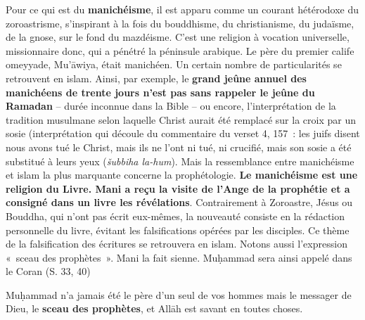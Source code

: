 

Pour ce qui est du \textbf{manichéisme}, il est apparu comme un courant
hétérodoxe du zoroastrisme, s'inspirant à la fois du bouddhisme, du
christianisme, du judaïsme, de la gnose, sur le fond du mazdéisme. C'est
une religion à vocation universelle, missionnaire donc, qui a pénétré la
péninsule arabique. Le père du premier calife omeyyade, Mu'āwiya, était
manichéen. Un certain nombre de particularités se retrouvent en islam.
Ainsi, par exemple, le \textbf{grand jeûne annuel des manichéens de
trente jours n'est pas sans rappeler le jeûne du Ramadan} -- durée
inconnue dans la Bible -- ou encore, l'interprétation de la tradition
musulmane selon laquelle Christ aurait été remplacé sur la croix par un
sosie (interprétation qui découle du commentaire du verset 4, 157~: les
juifs disent nous avons tué le Christ, mais ils ne l'ont ni tué, ni
crucifié, mais son sosie a été substitué à leurs yeux (\emph{šubbiha
la-hum}). Mais la ressemblance entre manichéisme et islam la plus
marquante concerne la prophétologie. \textbf{Le manichéisme est une
religion du Livre. Mani a reçu la visite de l'Ange de la prophétie et a
consigné dans un livre les révélations}. Contrairement à Zoroastre,
Jésus ou Bouddha, qui n'ont pas écrit eux-mêmes, la nouveauté consiste
en la rédaction personnelle du livre, évitant les falsifications opérées
par les disciples. Ce thème de la falsification des écritures se
retrouvera en islam. Notons aussi l'expression «~sceau des prophètes~».
Mani la fait sienne. Muḥammad sera ainsi appelé dans le Coran (S. 33,
40)

Muḥammad n'a jamais été le père d'un seul de vos hommes mais le messager
de Dieu, le \textbf{sceau des prophètes}, et Allāh est savant en toutes
choses.

